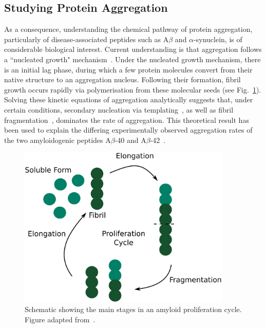 \subsection{Studying Protein Aggregation}
\label{subect:aggregation}
As a consequence, understanding the chemical pathway of protein aggregation, particularly of disease-associated peptides such as A${\beta}$ and $\alpha$-synuclein, is of considerable biological interest. Current understanding is that aggregation follows a ``nucleated growth" mechanism~\cite{chiti2006}. Under the nucleated growth mechanism, there is an initial lag phase, during which a few protein molecules convert from their native structure to an aggregation nucleus. Following their formation, fibril growth occurs rapidly via polymerisation from these molecular seeds (see Fig.~\ref{fig:aggregation_pathways}). Solving these kinetic equations of aggregation analytically suggests that, under certain conditions, secondary nucleation via templating~\cite{knowles2009}, as well as fibril fragmentation~\cite{Knowles2011}, dominates the rate of aggregation. This theoretical result has been used to explain the differing experimentally observed aggregation rates of the two amyloidogenic peptides A$\beta$-40 and A$\beta$-42~\cite{cohen2013, meisl2014}.

\begin{figure}
   \begin{center}
      \includegraphics*[clip=true, width=4in]{sizing/proliferation.pdf}
      \caption{Schematic showing the main stages in an amyloid proliferation cycle. Figure adapted from~\cite{knowles2009}.}
      \label{fig:aggregation_pathways}
   \end{center}
\end{figure}

